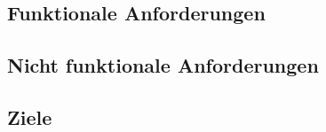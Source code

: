 \begin{spacing}{2}
\subsection{Funktionale Anforderungen}
\end{spacing}

\begin{spacing}{2}
\subsection{Nicht funktionale Anforderungen}
\end{spacing}

\begin{spacing}{2}
\section{Ziele}
\end{spacing}
    
